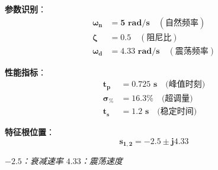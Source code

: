 \begin{tcolorbox}[colback=green!5!white,colframe=green!75!black,title={具体例：欠阻尼二阶系统 $G(s) = \frac{25}{s^2+5s+25}$},boxsep=3pt,left=3pt,right=3pt,top=3pt,bottom=3pt]
\begin{minipage}[b]{0.39\textwidth}
\textbf{参数识别}：
\begin{align*}
\boldsymbol{\omega_n} &\mathbf{= 5 \text{ rad/s}} \quad (\text{自然频率}) \\
\boldsymbol{\zeta} &\mathbf{= 0.5} \quad (\text{阻尼比}) \\
\boldsymbol{\omega_d} &\mathbf{= 4.33 \text{ rad/s}} \quad (\text{震荡频率})
\end{align*}

\textbf{性能指标}：
\begin{align*}
\mathbf{t_p} &\mathbf{= 0.725 \text{ s}} \quad \text{(峰值时刻)} \\
\mathbf{\sigma_\%} &\mathbf{= 16.3\%} \quad \text{(超调量)} \\
\mathbf{t_s} &\mathbf{= 1.2 \text{ s}} \quad \text{(稳定时间)}
\end{align*}

\textbf{特征根位置}：
$$\mathbf{s_{1,2} = -2.5 \pm j4.33}$$
\vspace{0.2cm}

{\small \textit{$-2.5$：衰减速率  \quad $4.33$：震荡速度}}

\end{minipage}

\end{tcolorbox}